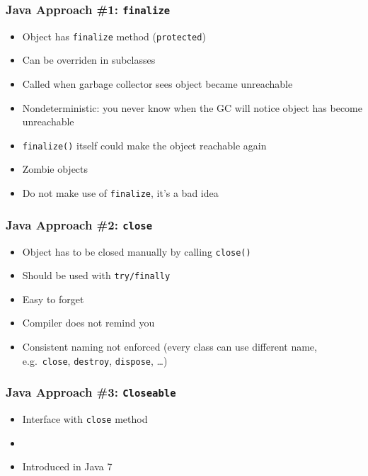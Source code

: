 \documentclass{../ucll-slides}
\begin{document}
\begin{frame}
  \frametitle{Java Approach \#1: {\tt finalize}}
  \begin{itemize}
    \item Object has {\tt finalize} method ({\tt protected})
    \item Can be overriden in subclasses
    \item Called when garbage collector sees object became unreachable
  \end{itemize}
  \vskip5mm
  \begin{itemize}
    \item Nondeterministic: you never know when the GC will notice object has become unreachable
    \item {\tt finalize()} itself could make the object reachable again
    \item Zombie objects
    \item Do not make use of {\tt finalize}, it's a bad idea
  \end{itemize}
\end{frame}

\begin{frame}
  \frametitle{Java Approach \#2: {\tt close}}
  \begin{itemize}
    \item Object has to be closed manually by calling {\tt close()}
    \item Should be used with {\tt try/finally}
  \end{itemize}
  \vskip5mm
  \begin{itemize}
    \item Easy to forget
    \item Compiler does not remind you
    \item Consistent naming not enforced (every class can use different name, e.g.\ {\tt close}, {\tt destroy}, {\tt dispose}, \dots)
  \end{itemize}
\end{frame}

\begin{frame}
  \frametitle{Java Approach \#3: {\tt Closeable}}
  \begin{itemize}
    \item Interface with {\tt close} method
    \item {}
    \item Introduced in Java 7
  \end{itemize}
  \vskip5mm
\end{frame}
\end{document}
